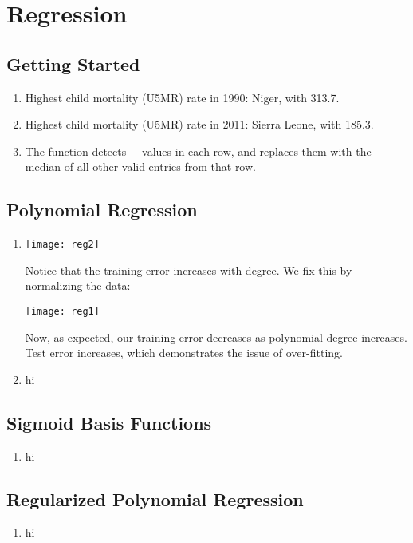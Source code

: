 \documentclass{article}
\begin{document}
\section{Regression}
\subsection{Getting Started}

\begin{enumerate}
\item Highest child mortality (U5MR) rate in 1990: Niger, with 313.7.
\item Highest child mortality (U5MR) rate in 2011: Sierra Leone, with 185.3.
\item The function detects \_ values in each row, and replaces
  them with the median of all other valid entries from that row.
\end{enumerate}

\subsection{Polynomial Regression}

\begin{enumerate}
\item \begin{center}
  \texttt{[image: reg2]}
\end{center}
  Notice that the training error increases with degree. We fix this
  by normalizing the data:
  \begin{center}
      \texttt{[image: reg1]}
  \end{center}
  Now, as expected, our training error decreases as polynomial degree
  increases. Test error increases, which demonstrates the issue
  of over-fitting.
\item hi
\end{enumerate}

\subsection{Sigmoid Basis Functions}

\begin{enumerate}
  \item hi
\end{enumerate}

\subsection{Regularized Polynomial Regression}

\begin{enumerate}
  \item hi
\end{enumerate}
\end{document}
